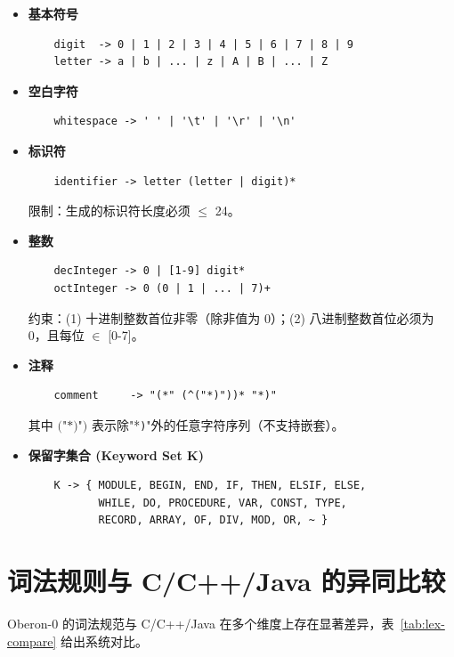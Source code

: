 \documentclass[a4paper]{article}
\begin{document}
\begin{itemize}
    \item \textbf{基本符号}
    \begin{verbatim}
    digit  -> 0 | 1 | 2 | 3 | 4 | 5 | 6 | 7 | 8 | 9
    letter -> a | b | ... | z | A | B | ... | Z
    \end{verbatim}

    \item \textbf{空白字符}
    \begin{verbatim}
    whitespace -> ' ' | '\t' | '\r' | '\n'
    \end{verbatim}

    \item \textbf{标识符}
    \begin{verbatim}
    identifier -> letter (letter | digit)*
    \end{verbatim}
    限制：生成的标识符长度必须 $\leq$ 24。

    \item \textbf{整数}
    \begin{verbatim}
    decInteger -> 0 | [1-9] digit*
    octInteger -> 0 (0 | 1 | ... | 7)+
    \end{verbatim}
    约束：(1) 十进制整数首位非零（除非值为 0）；(2) 八进制整数首位必须为 0，且每位 $\in$ [0-7]。

    \item \textbf{注释}
    \begin{verbatim}
    comment     -> "(*" (^("*)"))* "*)"
    \end{verbatim}
    其中 $\texttt{\^{}("*)")}$ 表示除"*\texttt{)}"外的任意字符序列（不支持嵌套）。

    \item \textbf{保留字集合 (Keyword Set K)}
    \begin{verbatim}
    K -> { MODULE, BEGIN, END, IF, THEN, ELSIF, ELSE,
           WHILE, DO, PROCEDURE, VAR, CONST, TYPE,
           RECORD, ARRAY, OF, DIV, MOD, OR, ~ }
    \end{verbatim}
\end{itemize}

\section{词法规则与 C/C++/Java 的异同比较}

Oberon-0 的词法规范与 C/C++/Java 在多个维度上存在显著差异，表~\ref{tab:lex-compare} 给出系统对比。
\end{document}
